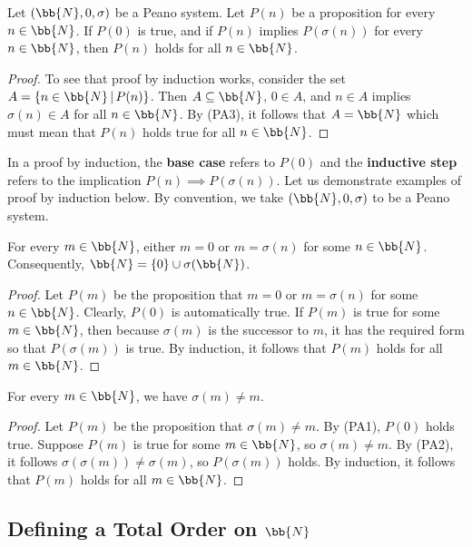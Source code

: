 \begin{theorem}\label{ch1thm_proof_by_induction}
	Let $(\bb{N}, 0, \sigma)$ be a Peano system.
	Let $P(n)$ be a proposition for every $n\in\bb{N}$.
	If $P(0)$ is true, and if $P(n)$ implies $P(\sigma(n))$ for every $n\in\bb{N}$, then $P(n)$ holds for all $n\in\bb{N}$. 
\end{theorem}
\begin{proof}
	To see that proof by induction works, consider the set $A = \{ n\in\bb{N} \,|\, P(n) \}$.
	Then $A\subseteq\bb{N}$, $0\in A$, and $n\in A$ implies $\sigma(n)\in A$ for all $n\in\bb{N}$.
	By (PA3), it follows that $A = \bb{N}$ which must mean that $P(n)$ holds true for all $n\in\bb{N}$.
\end{proof}

In a proof by induction, the \textbf{base case} refers to $P(0)$ and the \textbf{inductive step} refers to the implication $P(n)\implies P(\sigma(n))$. 
Let us demonstrate examples of proof by induction below.
By convention, we take $(\bb{N}, 0, \sigma)$ to be a Peano system. 

\begin{prop}\label{ch1thm_peano_zero_or_succ}
	For every $m\in\bb{N}$, either $m = 0$ or $m = \sigma(n)$ for some $n\in\bb{N}$. 
	Consequently, $\bb{N} = \{0\}\cup \sigma(\bb{N})$. 
\end{prop}
\begin{proof}
	Let $P(m)$ be the proposition that $m = 0$ or $m = \sigma(n)$ for some $n\in\bb{N}$. 
	Clearly, $P(0)$ is automatically true. 
	If $P(m)$ is true for some $m\in\bb{N}$, then because $\sigma(m)$ is the successor to $m$, it has the required form so that $P(\sigma(m))$ is true. 
	By induction, it follows that $P(m)$ holds for all $m\in\bb{N}$. 
\end{proof}

\begin{prop}\label{ch1thm_peano_elem_not_equal_to_its_succ}
	For every $m\in\bb{N}$, we have $\sigma(m)\ne m$. 
\end{prop}
\begin{proof}
	Let $P(m)$ be the proposition that $\sigma(m)\ne m$.
	By (PA1), $P(0)$ holds true. 
	Suppose $P(m)$ is true for some $m\in\bb{N}$, so $\sigma(m)\ne m$. 
	By (PA2), it follows $\sigma(\sigma(m))\ne \sigma(m)$, so $P(\sigma(m))$ holds. 
	By induction, it follows that $P(m)$ holds for all $m\in\bb{N}$. 
\end{proof}



\subsection{Defining a Total Order on $\bb{N}$}

